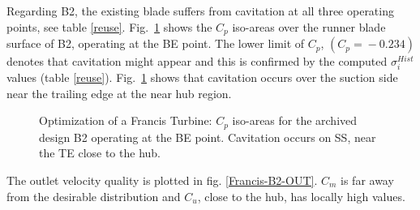\FloatBarrier
Regarding B2, the existing blade suffers from cavitation at all three operating points, see table \ref{reuse}. Fig.\ \ref{Francis-B2-BE} shows the $C_p$ iso-areas over the runner blade surface of B2, operating at the BE point. The lower limit of $C_p$, $(C_p\!=\!-0.234)$ denotes that cavitation might appear and this is confirmed by the computed $\sigma_i^{Hist}$ values (table \ref{reuse}). Fig.\ \ref{Francis-B2-BE} shows that cavitation occurs over the suction side near the trailing edge at the near hub region.     


\begin{figure}[h!]
\begin{minipage}[b]{1\linewidth}
 \centering
\end{minipage}
\caption{Optimization of a Francis Turbine: $C_p$ iso-areas for the archived design B2 operating at the BE point. Cavitation occurs on SS, near the TE close to the hub.}
\label{Francis-B2-BE}
\end{figure}

The outlet velocity quality is plotted in fig. \ref{Francis-B2-OUT}. $C_m$ is far away from the desirable distribution and $C_u$, close to the hub, has locally high values.   

